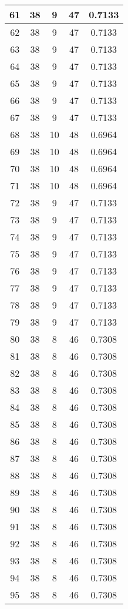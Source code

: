 \documentclass[letterpaper, 12pt]{article}
\begin{document}
\begin{longtable}{|c|c|c|c|c|}
\hline
61 & 38 & 9 & 47 & 0.7133 \\
\hline
62 & 38 & 9 & 47 & 0.7133 \\
\hline
63 & 38 & 9 & 47 & 0.7133 \\
\hline
64 & 38 & 9 & 47 & 0.7133 \\
\hline
65 & 38 & 9 & 47 & 0.7133 \\
\hline
66 & 38 & 9 & 47 & 0.7133 \\
\hline
67 & 38 & 9 & 47 & 0.7133 \\
\hline
68 & 38 & 10 & 48 & 0.6964 \\
\hline
69 & 38 & 10 & 48 & 0.6964 \\
\hline
70 & 38 & 10 & 48 & 0.6964 \\
\hline
71 & 38 & 10 & 48 & 0.6964 \\
\hline
72 & 38 & 9 & 47 & 0.7133 \\
\hline
73 & 38 & 9 & 47 & 0.7133 \\
\hline
74 & 38 & 9 & 47 & 0.7133 \\
\hline
75 & 38 & 9 & 47 & 0.7133 \\
\hline
76 & 38 & 9 & 47 & 0.7133 \\
\hline
77 & 38 & 9 & 47 & 0.7133 \\
\hline
78 & 38 & 9 & 47 & 0.7133 \\
\hline
79 & 38 & 9 & 47 & 0.7133 \\
\hline
80 & 38 & 8 & 46 & 0.7308 \\
\hline
81 & 38 & 8 & 46 & 0.7308 \\
\hline
82 & 38 & 8 & 46 & 0.7308 \\
\hline
83 & 38 & 8 & 46 & 0.7308 \\
\hline
84 & 38 & 8 & 46 & 0.7308 \\
\hline
85 & 38 & 8 & 46 & 0.7308 \\
\hline
86 & 38 & 8 & 46 & 0.7308 \\
\hline
87 & 38 & 8 & 46 & 0.7308 \\
\hline
88 & 38 & 8 & 46 & 0.7308 \\
\hline
89 & 38 & 8 & 46 & 0.7308 \\
\hline
90 & 38 & 8 & 46 & 0.7308 \\
\hline
91 & 38 & 8 & 46 & 0.7308 \\
\hline
92 & 38 & 8 & 46 & 0.7308 \\
\hline
93 & 38 & 8 & 46 & 0.7308 \\
\hline
94 & 38 & 8 & 46 & 0.7308 \\
\hline
95 & 38 & 8 & 46 & 0.7308 \\

\end{longtable}
\end{document}
